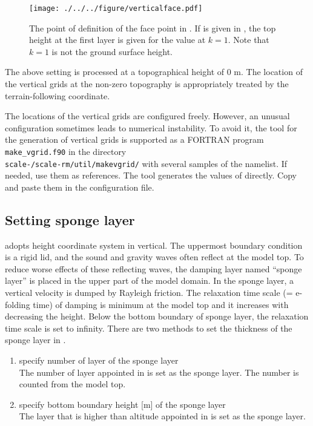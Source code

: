 \begin{figure}[tb]
\begin{center}
  \texttt{[image: ./../../figure/verticalface.pdf]}\\
  \caption{The point of definition of the face point in \scalerm. If  is given in , the top height at the first layer is given for the value at $k=1$. Note that $k=1$ is not the ground surface height.}
  \label{fig:scale_grid}
\end{center}
\end{figure}

The above setting is processed at a topographical height of 0 m.
The location of the vertical grids at the non-zero topography is appropriately treated by the terrain-following coordinate.

The locations of the vertical grids are configured freely.
However, an unusual configuration sometimes leads to numerical instability. To avoid it, the tool for the generation of vertical grids is supported as a FORTRAN program \verb|make_vgrid.f90| in the directory\\ \texttt{scale-\version/scale-rm/util/makevgrid/} with several samples of the namelist. If needed, use them as references. The tool generates the values of  directly. Copy and paste them in the configuration file.

\subsection{Setting sponge layer} \label{subsec:raydamp}

\scalerm adopts height coordinate system in vertical. The uppermost boundary condition is a rigid lid, and the sound and gravity waves often reflect at the model top. To reduce worse effects of these reflecting waves, the damping layer named ``sponge layer'' is placed in the upper part of the model domain. In the sponge layer, a vertical velocity is dumped by Rayleigh friction. The relaxation time scale (= e-folding time) of damping is minimum at the model top and it increases with decreasing the height. Below the bottom boundary of sponge layer, the relaxation time scale is set to infinity.
There are two methods to set the thickness of the sponge layer in .

\begin{enumerate}
\item specify number of layer of the sponge layer \\
  The number of layer appointed in  is set as the sponge layer. The number is counted from the model top.
\item specify bottom boundary height [m] of the sponge layer \\
  The layer that is higher than altitude appointed in  is set as the sponge layer.
\end{enumerate}

